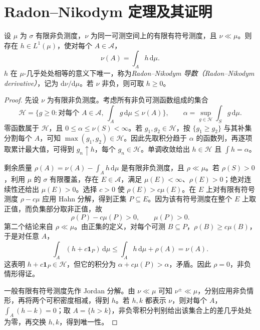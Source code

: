 \section{Radon--Nikodym 定理及其证明}
\begin{theorem}
设 $\mu$ 为 $\sigma$ 有限非负测度，$\nu$ 为同一可测空间上的有限有符号测度，且 $\nu\ll\mu$。则存在 $h\in L^1(\mu)$，使对每个 $A\in\mathcal A$，
\begin{equation}
 \nu(A)=\int_Ah\,\mathrm d\mu.
 \label{eq:mt-radon-nikodym}
\end{equation}
$h$ 在 $\mu$-几乎处处相等的意义下唯一，称为\emph{Radon--Nikodym 导数（Radon--Nikodym derivative）}，记为 $\mathrm d\nu/\mathrm d\mu$。若 $\nu$ 非负，则可取 $h\geq0$。
\label{thm:mt-rn}
\end{theorem}
\begin{proof}
先设 $\nu$ 为有限非负测度。考虑所有非负可测函数组成的集合
\[
 \mathcal H=\{g\geq0:\text{对每个 }A\in\mathcal A,\ \int_Ag\,\mathrm d\mu\leq\nu(A)\},
 \qquad \alpha=\sup_{g\in\mathcal H}\int_Sg\,\mathrm d\mu.
\]
零函数属于 $\mathcal H$，且 $0\leq\alpha\leq\nu(S)<\infty$。若 $g_1,g_2\in\mathcal H$，按 $\{g_1\geq g_2\}$ 与其补集分割每个 $A$，可知 $\max(g_1,g_2)\in\mathcal H$。因此先取积分趋于 $\alpha$ 的函数列，再逐项取累计最大值，可得到 $g_n\uparrow h$，每个 $g_n\in\mathcal H$。单调收敛给出 $h\in\mathcal H$ 且 $\int h=\alpha$。

剩余质量 $\rho(A)=\nu(A)-\int_Ah\,\mathrm d\mu$ 是有限非负测度，且 $\rho\ll\mu$。若 $\rho(S)>0$，利用 $\mu$ 的 $\sigma$ 有限覆盖，存在 $E\in\mathcal A$，满足 $\mu(E)<\infty$、$\rho(E)>0$；绝对连续性还给出 $\mu(E)>0$。选择 $c>0$ 使 $\rho(E)>c\mu(E)$。在 $E$ 上对有限有符号测度 $\rho-c\mu$ 应用 Hahn 分解，得到正集 $P\subseteq E$。因为该有符号测度在整个 $E$ 上取正值，而负集部分取非正值，故
\[
 \rho(P)-c\mu(P)>0,\qquad \mu(P)>0.
\]
第二个结论来自 $\rho\ll\mu$。由正集的定义，对每个可测 $B\subseteq P$，$\rho(B)\geq c\mu(B)$，于是对任意 $A$，
\[
 \int_A(h+c\mathbf1_P)\,\mathrm d\mu
 \leq\int_Ah\,\mathrm d\mu+\rho(A)=\nu(A).
\]
这表明 $h+c\mathbf1_P\in\mathcal H$，但它的积分为 $\alpha+c\mu(P)>\alpha$，矛盾。因此 $\rho=0$，非负情形得证。

一般有限有符号测度先作 Jordan 分解。由 $\nu\ll\mu$ 可知 $\nu^\pm\ll\mu$，分别应用非负情形，再将两个可积密度相减，得到 $h$。若 $h,k$ 都表示 $\nu$，则对每个 $A$，$\int_A(h-k)=0$；取 $A=\{h>k\}$，非负零积分判别给出该集合上的差几乎处处为零，再交换 $h,k$，得到唯一性。
\end{proof}

